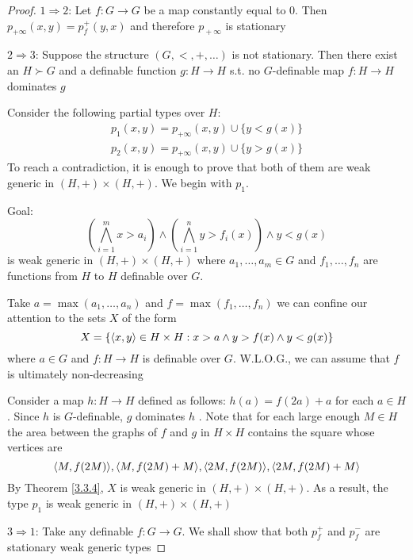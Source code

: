 \documentclass[11pt]{article}
\begin{document}
\begin{proof}
\(1\Rightarrow 2\): Let \(f:G\to G\) be a map constantly equal to 0. Then \(p_{+\infty}(x,y)=p_f^+(y,x)\) and
therefore \(p_{​+\infty}\) is stationary \label{Problem4}

\(2\Rightarrow 3\): Suppose the structure \((G,<,+,\dots)\) is not stationary. Then there exist an \(H\succ G\)
and a definable function \(g:H\to H\) s.t. no \(G\)-definable map \(f:H\to H\) dominates \(g\)

Consider the following partial types over \(H\):
\begin{gather*}
p_1(x,y)=p_{+\infty}(x,y)\cup\{y<g(x)\}\\
p_2(x,y)=p_{+\infty}(x,y)\cup\{y>g(x)\}
\end{gather*}
To reach a contradiction, it is enough to prove that both of them are weak generic
in \((H,+)\times(H,+)\). We begin with \(p_1\).

Goal:
\begin{equation*}
(\bigwedge_{i=1}^mx>a_i)\wedge(\bigwedge_{i=1}^ny>f_i(x))\wedge y<g(x)
\end{equation*}
is weak generic in \((H,+)\times(H,+)\) where \(a_1,\dots,a_m\in G\) and \(f_1,\dots,f_n\) are functions
from \(H\) to \(H\) definable over \(G\).

Take \(a=\max(a_1,\dots,a_n)\) and \(f=\max(f_1,\dots,f_n)\) we can confine our attention to the
sets \(X\) of the form
\begin{equation*}
X=\{\langle x,y\rangle\in H\times H:x>a\wedge y>f(x)\wedge y<g(x)\}
\end{equation*}
where \(a\in G\) and \(f:H\to H\) is definable over \(G\). W.L.O.G., we can assume that \(f\) is
ultimately non-decreasing

Consider a map \(h:H\to H\) defined as follows: \(h(a)=f(2a)+a\) for each \(a\in H\). Since \(h\)
is \(G\)-definable, \(g\) dominates \(h\) \label{Problem5}. Note that for each large enough \(M\in H\) the area
between the graphs of \(f\) and \(g\) in \(H\times H\) contains the square whose vertices are
\begin{equation*}
\langle M,f(2M)\rangle,\langle M,f(2M)+M\rangle, \langle 2M,f(2M)\rangle, \langle 2M,f(2M)+M\rangle
\end{equation*}
By Theorem \ref{3.3.4}, \(X\) is weak generic in \((H,+)\times(H,+)\). As a result, the type \(p_1\) is
weak generic in \((H,+)\times(H,+)\)

\(3\Rightarrow 1\): Take any definable \(f:G\to G\). We shall show that both \(p_f^+\) and \(p_f^-\) are
stationary weak generic types


\end{proof}
\end{document}
